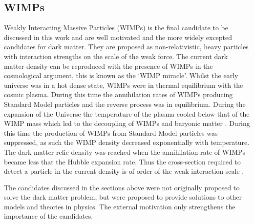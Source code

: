 \subsection{WIMPs}\label{sec:DMOverview/WIMPs}
Weakly Interacting Massive Particles (WIMPs) is the final candidate to be discussed in this work and are well motivated and the more widely excepted candidates for dark matter. They are proposed as non-relativistic, heavy particles with interaction strengths on the scale of the weak force. The current dark matter density can be reproduced with the presence of WIMPs in the cosmological argument, this is known as the `WIMP miracle'\cite{DMPrimer}. Whilst the early universe was in a hot dense state, WIMPs were in thermal equilibrium with the cosmic plasma. During this time the annihilation rates of WIMPs producing Standard Model particles and the reverse process was in equilibrium. During the expansion of the Universe  the temperature of the plasma cooled below that of the WIMP mass which led to the decoupling of WIMPs and baryonic matter \cite{DMProd}. During this time the production of WIMPs from Standard Model particles was suppressed, as such the WIMP density decreased exponentially with temperature. The dark matter relic density was reached when the annihilation rate of WIMPs became less that the Hubble expansion rate. Thus the cross-section required to detect a particle in the current density is of order of the weak interaction scale \cite{DMProd}.

\begin{flushleft}
The candidates discussed in the sections above were not originally proposed to solve the dark matter problem, but were proposed to provide solutions to other models and theories in physics. The external motivation only strengthens the importance of the candidates.
\end{flushleft}

